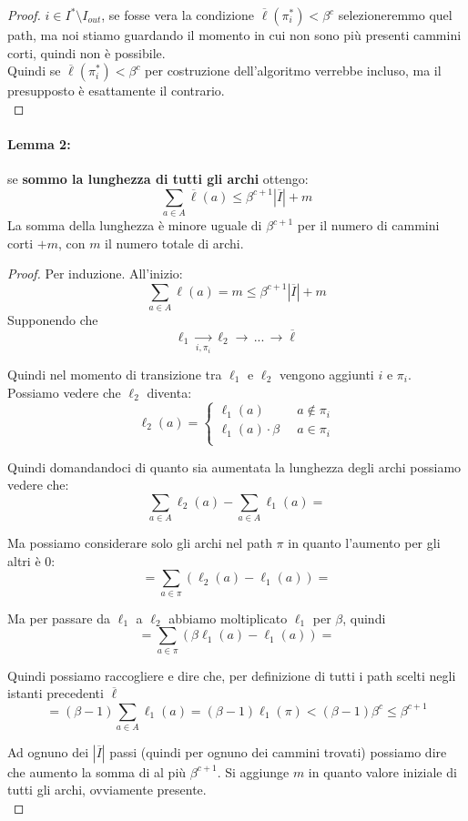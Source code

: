 \begin{proof}
	$i \in I^\ast \setminus I_{out}$, se fosse vera la condizione $\overline{\ell} (\pi_i^\ast) < \beta^c$ selezioneremmo quel path, ma noi stiamo guardando il momento in cui non sono più presenti cammini corti, quindi non è possibile.\\
	Quindi se $\overline{\ell} (\pi_i^\ast) < \beta^c$ per costruzione dell'algoritmo verrebbe incluso, ma il presupposto è esattamente il contrario.\\
\end{proof}

\newpage

\paragraph{Lemma 2:} se \textbf{sommo la lunghezza di tutti gli archi} ottengo:
$$ \sum_{a \in A} \overline{\ell}(a) \leq \beta^{c+1} |\overline{I}| + m $$
La somma della lunghezza è minore uguale di $\beta^{c+1}$ per il numero di cammini corti $+ m$, con $m$ il numero totale di archi.\\

\begin{proof}
	Per induzione. All'inizio: 
	$$ \sum_{a \in A} \ell (a) = m  \leq \beta^{c+1} |\overline{I}| + m$$
	Supponendo che 
	$$ \ell_1 \xrightarrow[i, \pi_i]{} \ell_2 \rightarrow \, ... \, \rightarrow \overline{\ell}$$
	
	Quindi nel momento di transizione tra $\ell_1$ e $\ell_2$ vengono aggiunti $i$ e $\pi_i$. \\
	Possiamo vedere che $\ell_2$ diventa:
	$$
	\ell_2 (a) = \begin{cases}
		\ell_1 (a) & a \notin \pi_i \\
		\ell_1 (a) \cdot \beta \;\; & a \in \pi_i \\
	\end{cases}
	$$
	
	Quindi domandandoci di quanto sia aumentata la lunghezza degli archi possiamo vedere che:
	$$ \sum_{a \in A} \ell_2 (a) - \sum_{a \in A} \ell_1 (a) = $$
	
	Ma possiamo considerare solo gli archi nel path $\pi$ in quanto l'aumento per gli altri è 0: 
	$$ = \sum_{a \in \pi} \left(\ell_2 (a) - \ell_1 (a)\right) =$$
	
	Ma per passare da $\ell_1$ a $\ell_2$ abbiamo moltiplicato $\ell_1$ per $\beta$, quindi
	$$ = \sum_{a \in \pi} \left( \beta \ell_1 (a) - \ell_1 (a) \right) = $$
	
	Quindi possiamo raccogliere e dire che, per definizione di tutti i path scelti negli istanti precedenti $\overline{\ell}$
	$$ = (\beta -1) \sum_{a \in A} \ell_1 (a) = (\beta -1) \ell_1 (\pi) < (\beta -1) \beta^c \leq \beta^{c+1} $$
	
	Ad ognuno dei $|\overline{I}|$ passi (quindi per ognuno dei cammini trovati) possiamo dire che aumento la somma di al più $\beta^{c+1}$. Si aggiunge $m$ in quanto valore iniziale di tutti gli archi, ovviamente presente.\\
\end{proof}

